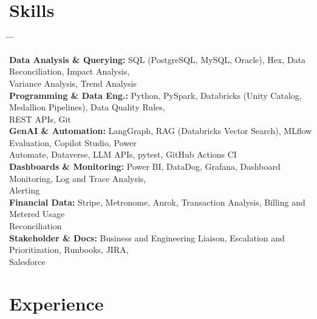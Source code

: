 \documentclass[10pt, letterpaper]{article}
\begin{document}
    \section{Skills}
        \begin{tabbing}
    \hspace{5.2cm} \= \hspace{4cm} \= \hspace{4cm} \= \kill %

    \textbf{Data Analysis \& Querying:} \> SQL (PostgreSQL, MySQL, Oracle), Hex, Data Reconciliation, Impact Analysis,\\ \> Variance Analysis, Trend Analysis\\

    \textbf{Programming \& Data Eng.:} \> Python, PySpark, Databricks (Unity Catalog, Medallion Pipelines), Data Quality Rules,\\ \> REST APIs, Git\\

    \textbf{GenAI \& Automation:} \> LangGraph, RAG (Databricks Vector Search), MLflow Evaluation, Copilot Studio, Power\\ \> Automate, Dataverse, LLM APIs, pytest, GitHub Actions CI\\

    \textbf{Dashboards \& Monitoring:} \> Power BI, DataDog, Grafana, Dashboard Monitoring, Log and Trace Analysis,\\ \> Alerting\\

    \textbf{Financial Data:} \> Stripe, Metronome, Anrok, Transaction Analysis, Billing and Metered Usage\\ \> Reconciliation\\

    \textbf{Stakeholder \& Docs:} \> Business and Engineering Liaison, Escalation and Prioritization, Runbooks, JIRA,\\ \> Salesforce
\end{tabbing}

    \section{Experience}
\end{document}

